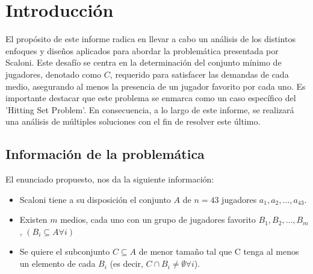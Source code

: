 \section{Introducción}

El propósito de este informe radica en llevar a cabo un análisis de los 
distintos enfoques y diseños aplicados para abordar la problemática presentada por 
Scaloni. Este desafío se centra en la determinación del conjunto mínimo de jugadores,
denotado como $C$, requerido para satisfacer las demandas de cada medio, asegurando al 
menos la presencia de un jugador favorito por cada uno. Es importante destacar que este 
problema se enmarca como un caso específico del 'Hitting Set Problem'. 
En consecuencia, a lo largo de este informe, se realizará una análisis de múltiples soluciones con el fin de resolver este último. 

\subsection{Información de la problemática}

El enunciado propuesto, nos da la siguiente información:

\begin{itemize}

    \item Scaloni tiene a su disposición el conjunto $A$ de $n=43$ jugadores $a_1, a_2, \dots, a_{43}$.
    \item Existen $m$ medios, cada uno con un grupo de jugadores favorito $B_1, B_2, \dots, B_m$, 
    $(B_i \subseteq A \forall i)$
    \item Se quiere el subconjunto $C \subseteq A$ de menor tamaño tal que C tenga al menos un elemento de cada $B_i$ (es decir, $C \cap B_i \neq \emptyset \forall i$).

\end{itemize}
